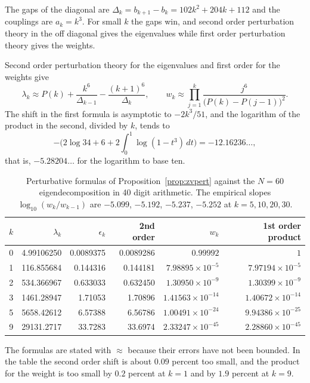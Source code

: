 The gaps of the diagonal are $\Delta_k=b_{k+1}-b_k=102k^2+204k+112$ and the couplings are $a_k=k^3$. For small $k$ the gaps win, and second order perturbation theory in the off diagonal gives the eigenvalues while first order perturbation theory gives the weights.

\begin{proposition}\label{prop:zvpert}
Second order perturbation theory for the eigenvalues and first order for the weights give
\[
\lambda_k\approx P(k)+\frac{k^6}{\Delta_{k-1}}-\frac{(k+1)^6}{\Delta_k},\qquad
w_k\approx\prod_{j=1}^{k}\frac{j^6}{\big(P(k)-P(j-1)\big)^2}.
\]
The shift in the first formula is asymptotic to $-2k^3/51$, and the logarithm of the product in the second, divided by $k$, tends to
\[
-\Big(2\log 34+6+2\!\int_0^1\!\log(1-t^3)\,dt\Big)=-12.16236\ldots,
\]
that is, $-5.28204\ldots$ for the logarithm to base ten.
\end{proposition}

\begin{table}[h]
\centering
\begin{tabular}{rrrrrr}
\toprule
$k$ & $\lambda_k$ & $\epsilon_k$ & 2nd order & $w_k$ & 1st order product\\
\midrule
0 & 4.99106250 & 0.0089375 & 0.0089286 & $0.99992$ & $1$\\
1 & 116.855684 & 0.144316 & 0.144181 & $7.98895\times10^{-5}$ & $7.97194\times10^{-5}$\\
2 & 534.366967 & 0.633033 & 0.632450 & $1.30950\times10^{-9}$ & $1.30399\times10^{-9}$\\
3 & 1461.28947 & 1.71053 & 1.70896 & $1.41563\times10^{-14}$ & $1.40672\times10^{-14}$\\
5 & 5658.42612 & 6.57388 & 6.56786 & $1.00491\times10^{-24}$ & $9.94386\times10^{-25}$\\
9 & 29131.2717 & 33.7283 & 33.6974 & $2.33247\times10^{-45}$ & $2.28860\times10^{-45}$\\
\bottomrule
\end{tabular}
\caption{Perturbative formulas of Proposition~\ref{prop:zvpert} against the $N=60$ eigendecomposition in 40 digit arithmetic. The empirical slopes $\log_{10}(w_k/w_{k-1})$ are $-5.099$, $-5.192$, $-5.237$, $-5.252$ at $k=5,10,20,30$.}
\end{table}

The formulas are stated with $\approx$ because their errors have not been bounded. In the table the second order shift is about $0.09$ percent too small, and the product for the weight is too small by $0.2$ percent at $k=1$ and by $1.9$ percent at $k=9$.


